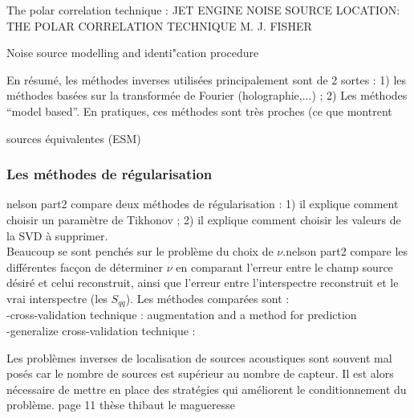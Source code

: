 The polar correlation technique : JET ENGINE NOISE SOURCE LOCATION: 
THE 
POLAR 
CORRELATION 
TECHNIQUE 
M. 
J. 
FISHER

Noise source modelling and identi"cation procedure


En résumé, les méthodes inverses utilisées principalement sont de 2 sortes : 1) les méthodes basées sur la transformée de Fourier (holographie,...) ; 2) Les méthodes ``model based''. En pratiques, ces méthodes sont très proches (ce que montrent %





sources équivalentes (ESM)

\subsubsection{Les méthodes de régularisation}
nelson part2 compare deux méthodes de régularisation : 1) il explique comment choisir un paramètre de Tikhonov ; 2) il explique comment choisir les valeurs de la SVD à supprimer.\\ Beaucoup se sont penchés sur le problème du choix de $\nu$.nelson part2 compare les différentes facçon de déterminer $\nu$ en comparant l'erreur entre le champ source désiré et celui reconstruit, ainsi que l'erreur entre l'interspectre reconstruit et le vrai interspectre (les $S_{qq}$). Les méthodes comparées sont : \\
-cross-validation technique : %
augmentation and a method for prediction\\
-generalize cross-validation technique : %






Les problèmes inverses de localisation de sources acoustiques sont souvent mal posés car le nombre de sources est supérieur au nombre de capteur. Il est alors nécessaire de mettre en place des stratégies qui améliorent le conditionnement du problème. 
page 11 thèse thibaut le magueresse

